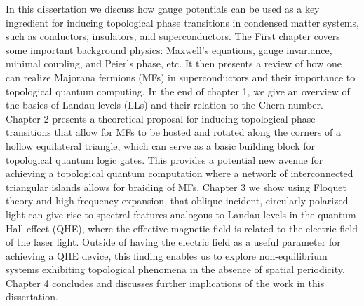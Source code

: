 In this dissertation we discuss how gauge potentials can be used as a key ingredient for inducing topological phase transitions in condensed matter systems, such as conductors, insulators, and superconductors.
The First chapter covers some important background physics: Maxwell's equations, gauge invariance, minimal coupling, and Peierls phase, etc.
It then presents a review of how one can realize Majorana fermions (MFs) in superconductors and their importance to topological quantum computing.
In the end of chapter 1, we give an overview of the basics of Landau levels (LLs) and their relation to the Chern number.
Chapter 2 presents a theoretical proposal for inducing topological phase transitions that allow for MFs to be hosted and rotated along the corners of a hollow equilateral triangle, which can serve as a basic building block for topological quantum logic gates.
This provides a potential new avenue for achieving a topological quantum computation where a network of interconnected triangular islands allows for braiding of MFs.
Chapter 3 we show using Floquet theory and high-frequency expansion, that oblique incident, circularly polarized light can give rise to spectral features analogous to Landau levels in the quantum Hall effect (QHE), where the effective magnetic field is related to the electric field of the laser light.
Outside of having the electric field as a useful parameter for achieving a QHE device, this finding enables us to explore non-equilibrium systems exhibiting topological phenomena in the absence of spatial periodicity.
Chapter 4 concludes and discusses further implications of the work in this dissertation.
